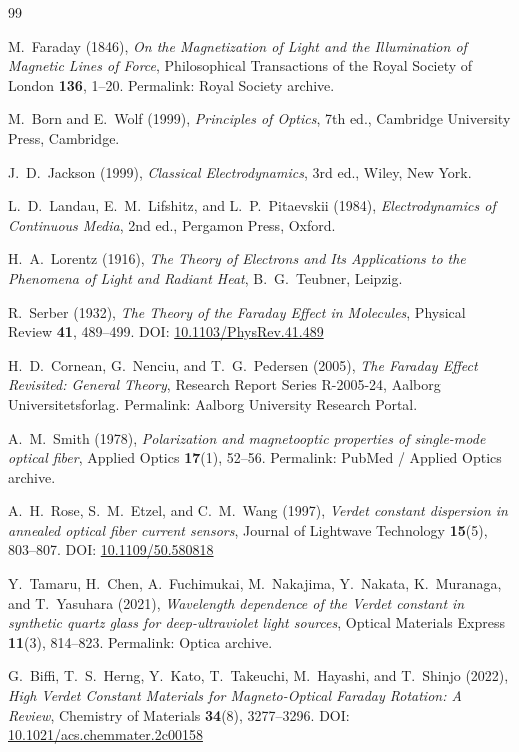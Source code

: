 \documentclass[11pt,a4paper]{article}
\begin{document}
    \begin{thebibliography}{99}

    M.~Faraday (1846),
    \textit{On the Magnetization of Light and the Illumination of Magnetic Lines of Force},
    Philosophical Transactions of the Royal Society of London \textbf{136}, 1--20.
    Permalink: Royal Society archive.

    M.~Born and E.~Wolf (1999),
    \textit{Principles of Optics}, 7th ed.,
    Cambridge University Press, Cambridge.

    J.~D.~Jackson (1999),
    \textit{Classical Electrodynamics}, 3rd ed.,
    Wiley, New York.

    L.~D.~Landau, E.~M.~Lifshitz, and L.~P.~Pitaevskii (1984),
    \textit{Electrodynamics of Continuous Media}, 2nd ed.,
    Pergamon Press, Oxford.

    H.~A.~Lorentz (1916),
    \textit{The Theory of Electrons and Its Applications to the Phenomena of Light and Radiant Heat},
    B.~G.~Teubner, Leipzig.

    R.~Serber (1932),
    \textit{The Theory of the Faraday Effect in Molecules},
    Physical Review \textbf{41}, 489--499.
    DOI: \href{https://doi.org/10.1103/PhysRev.41.489}{10.1103/PhysRev.41.489}

    H.~D.~Cornean, G.~Nenciu, and T.~G.~Pedersen (2005),
    \textit{The Faraday Effect Revisited: General Theory},
    Research Report Series R-2005-24,
    Aalborg Universitetsforlag.
    Permalink: Aalborg University Research Portal.

    A.~M.~Smith (1978),
    \textit{Polarization and magnetooptic properties of single-mode optical fiber},
    Applied Optics \textbf{17}(1), 52--56.
    Permalink: PubMed / Applied Optics archive.

    A.~H.~Rose, S.~M.~Etzel, and C.~M.~Wang (1997),
    \textit{Verdet constant dispersion in annealed optical fiber current sensors},
    Journal of Lightwave Technology \textbf{15}(5), 803--807.
    DOI: \href{https://doi.org/10.1109/50.580818}{10.1109/50.580818}

    Y.~Tamaru, H.~Chen, A.~Fuchimukai, M.~Nakajima, Y.~Nakata, K.~Muranaga, and T.~Yasuhara (2021),
    \textit{Wavelength dependence of the Verdet constant in synthetic quartz glass for deep-ultraviolet light sources},
    Optical Materials Express \textbf{11}(3), 814--823.
    Permalink: Optica archive.

    G.~Biffi, T.~S.~Herng, Y.~Kato, T.~Takeuchi, M.~Hayashi, and T.~Shinjo (2022),
    \textit{High Verdet Constant Materials for Magneto-Optical Faraday Rotation: A Review},
    Chemistry of Materials \textbf{34}(8), 3277--3296.
    DOI: \href{https://doi.org/10.1021/acs.chemmater.2c00158}{10.1021/acs.chemmater.2c00158}

    \end{thebibliography}
\end{document}
